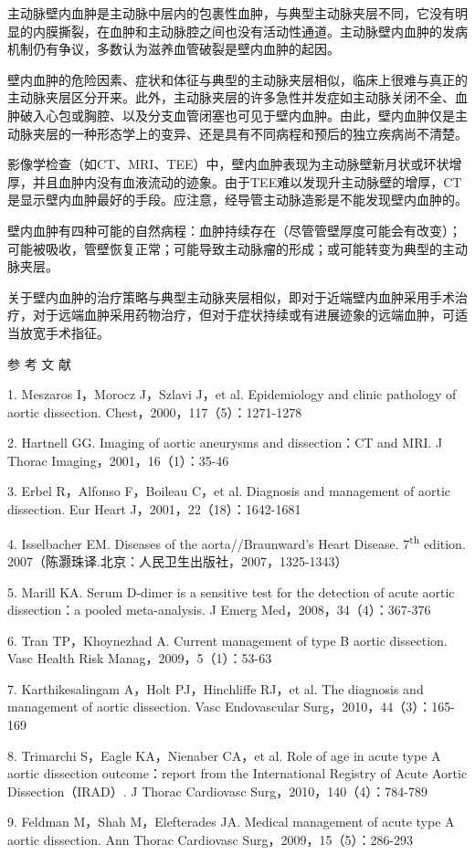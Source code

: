 主动脉壁内血肿是主动脉中层内的包裹性血肿，与典型主动脉夹层不同，它没有明显的内膜撕裂，在血肿和主动脉腔之间也没有活动性通道。主动脉壁内血肿的发病机制仍有争议，多数认为滋养血管破裂是壁内血肿的起因。

壁内血肿的危险因素、症状和体征与典型的主动脉夹层相似，临床上很难与真正的主动脉夹层区分开来。此外，主动脉夹层的许多急性并发症如主动脉关闭不全、血肿破入心包或胸腔、以及分支血管闭塞也可见于壁内血肿。由此，壁内血肿仅是主动脉夹层的一种形态学上的变异、还是具有不同病程和预后的独立疾病尚不清楚。

影像学检查（如CT、MRI、TEE）中，壁内血肿表现为主动脉壁新月状或环状增厚，并且血肿内没有血液流动的迹象。由于TEE难以发现升主动脉壁的增厚，CT是显示壁内血肿最好的手段。应注意，经导管主动脉造影是不能发现壁内血肿的。

壁内血肿有四种可能的自然病程：血肿持续存在（尽管管壁厚度可能会有改变）；可能被吸收，管壁恢复正常；可能导致主动脉瘤的形成；或可能转变为典型的主动脉夹层。

关于壁内血肿的治疗策略与典型主动脉夹层相似，即对于近端壁内血肿采用手术治疗，对于远端血肿采用药物治疗，但对于症状持续或有进展迹象的远端血肿，可适当放宽手术指征。

\protect\hypertarget{text00315.html}{}{}

\hypertarget{text00315.htmlux5cux23CHP10-9-5}{}
参 考 文 献

1. Meszaros I，Morocz J，Szlavi J，et al. Epidemiology and clinic
pathology of aortic dissection. Chest，2000，117（5）：1271-1278

2. Hartnell GG. Imaging of aortic aneurysms and dissection：CT and MRI.
J Thorac Imaging，2001，16（1）：35-46

3. Erbel R，Alfonso F，Boileau C，et al. Diagnosis and management of
aortic dissection. Eur Heart J，2001，22（18）：1642-1681

4. Isselbacher EM. Diseases of the aorta//Braunward's Heart Disease.
7\textsuperscript{th} edition.
2007（陈灏珠译.北京：人民卫生出版社，2007，1325-1343）

5. Marill KA. Serum D-dimer is a sensitive test for the detection of
acute aortic dissection：a pooled meta-analysis. J Emerg
Med，2008，34（4）：367-376

6. Tran TP，Khoynezhad A. Current management of type B aortic
dissection. Vasc Health Risk Manag，2009，5（1）：53-63

7. Karthikesalingam A，Holt PJ，Hinchliffe RJ，et al. The diagnosis and
management of aortic dissection. Vasc Endovascular
Surg，2010，44（3）：165-169

8. Trimarchi S，Eagle KA，Nienaber CA，et al. Role of age in acute type
A aortic dissection outcome：report from the International Registry of
Acute Aortic Dissection（IRAD）. J Thorac Cardiovasc
Surg，2010，140（4）：784-789

9. Feldman M，Shah M，Elefterades JA. Medical management of acute type A
aortic dissection. Ann Thorac Cardiovasc Surg，2009，15（5）：286-293

\protect\hypertarget{text00316.html}{}{}

